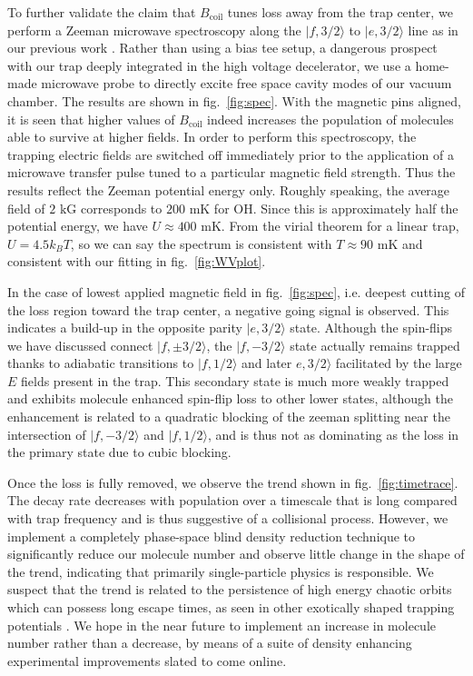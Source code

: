 \documentclass[%
 reprint,
 amsmath,amssymb,
 aps,
prl,
]{revtex4-1}
\begin{document}
To further validate the claim that $B_\text{coil}$ tunes loss away from the trap center, we perform a Zeeman microwave spectroscopy along the $|f,3/2\rangle$ to $|e,3/2\rangle$ line as in our previous work \cite{stuhl2012evap}. Rather than using a bias tee setup, a dangerous prospect with our trap deeply integrated in the high voltage decelerator, we use a home-made microwave probe to directly excite free space cavity modes of our vacuum chamber. The results are shown in fig.~\ref{fig:spec}. With the magnetic pins aligned, it is seen that higher values of $B_{\text{coil}}$ indeed increases the population of molecules able to survive at higher fields. In order to perform this spectroscopy, the trapping electric fields are switched off immediately prior to the application of a microwave transfer pulse tuned to a particular magnetic field strength. Thus the results reflect the Zeeman potential energy only. Roughly speaking, the average field of $2\text{ kG}$ corresponds to $200\text{ mK}$ for OH. Since this is approximately half the potential energy, we have $U\approx400\text{ mK}$. From the virial theorem for a linear trap, $U = 4.5k_BT$, so we can say the spectrum is consistent with $T\approx 90\text{ mK}$ and consistent with our fitting in fig.~\ref{fig:WVplot}.

In the case of lowest applied magnetic field in fig.~\ref{fig:spec}, i.e. deepest cutting of the loss region toward the trap center, a negative going signal is observed. This indicates a build-up in the opposite parity $|e,3/2\rangle$ state. Although the spin-flips we have discussed connect $|f,\pm3/2\rangle$, the $|f,-3/2\rangle$ state actually remains trapped thanks to adiabatic transitions to $|f,1/2\rangle$ and later $e,3/2\rangle$ facilitated by the large $E$ fields present in the trap. This secondary state is much more weakly trapped and exhibits molecule enhanced spin-flip loss to other lower states, although the enhancement is related to a quadratic blocking of the zeeman splitting near the intersection of $|f,-3/2\rangle$ and $|f,1/2\rangle$, and is thus not as dominating as the loss in the primary state due to cubic blocking.

Once the loss is fully removed, we observe the trend shown in fig.~\ref{fig:timetrace}. The decay rate decreases with population over a timescale that is long compared with trap frequency and is thus suggestive of a collisional process. However, we implement a completely phase-space blind density reduction technique to significantly reduce our molecule number and observe little change in the shape of the trend, indicating that primarily single-particle physics is responsible. We suspect that the trend is related to the persistence of high energy chaotic orbits which can possess long escape times, as seen in other exotically shaped trapping potentials \cite{Gonzalez-Ferez2014}. We hope in the near future to implement an increase in molecule number rather than a decrease, by means of a suite of density enhancing experimental improvements slated to come online.
\end{document}
